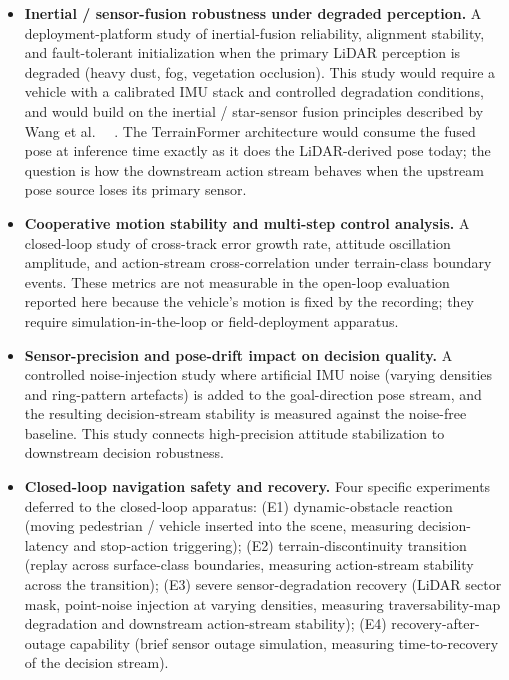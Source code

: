 \documentclass[sensors,article,submit,pdftex,moreauthors]{Definitions/mdpi}
\providecommand{\DIFadd}[1]{{\protect\color{red}#1}} %
\begin{document}
\begin{itemize}
    \item \textbf{\DIFadd{Inertial / sensor-fusion robustness under degraded perception.}} \DIFadd{A deployment-platform study of inertial-fusion reliability, alignment stability, and fault-tolerant initialization when the primary LiDAR perception is degraded (heavy dust, fog, vegetation occlusion). This study would require a vehicle with a calibrated IMU stack and controlled degradation conditions, and would build on the inertial / star-sensor fusion principles described by Wang et al.~\mbox{%
\cite{star_inertial_fusion}}\hskip0pt%
. The TerrainFormer architecture would consume the fused pose at inference time exactly as it does the LiDAR-derived pose today; the question is how the downstream action stream behaves when the upstream pose source loses its primary sensor.
    }\item \textbf{\DIFadd{Cooperative motion stability and multi-step control analysis.}} \DIFadd{A closed-loop study of cross-track error growth rate, attitude oscillation amplitude, and action-stream cross-correlation under terrain-class boundary events. These metrics are not measurable in the open-loop evaluation reported here because the vehicle's motion is fixed by the recording; they require simulation-in-the-loop or field-deployment apparatus.
    }\item \textbf{\DIFadd{Sensor-precision and pose-drift impact on decision quality.}} \DIFadd{A controlled noise-injection study where artificial IMU noise (varying densities and ring-pattern artefacts) is added to the goal-direction pose stream, and the resulting decision-stream stability is measured against the noise-free baseline. This study connects high-precision attitude stabilization to downstream decision robustness.
    }\item \textbf{\DIFadd{Closed-loop navigation safety and recovery.}} \DIFadd{Four specific experiments deferred to the closed-loop apparatus: (E1) dynamic-obstacle reaction (moving pedestrian / vehicle inserted into the scene, measuring decision-latency and stop-action triggering); (E2) terrain-discontinuity transition (replay across surface-class boundaries, measuring action-stream stability across the transition); (E3) severe sensor-degradation recovery (LiDAR sector mask, point-noise injection at varying densities, measuring traversability-map degradation and downstream action-stream stability); (E4) recovery-after-outage capability (brief sensor outage simulation, measuring time-to-recovery of the decision stream).
}\end{itemize}
\end{document}
